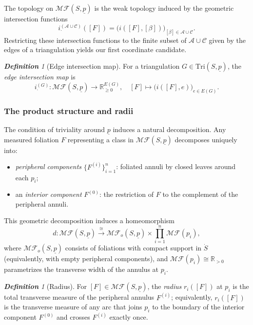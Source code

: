 \documentclass[11pt, letterpaper]{amsart}
\theoremstyle{definition}
\theoremstyle{remark}
\newtheorem{definition}[theorem]{\rm\bf Definition}
\newcommand{\up}{\underline{p}}
\newcommand{\Sp}{(S,\up)}
\newcommand{\TSp}{\text{Tri}\Sp}
\newcommand{\iG}{i^{(G)}}
\newcommand{\cMF}{\mathcal{MF}}
\newcommand{\cMFp}{\mathcal{MF} (S,\up)}
\newcommand{\cMFo}{\cMF_o(S,\up)}
\newcommand{\cAC}{\mathcal{A} \cup \mathcal{C}}
\newcommand{\bR}{\mathbb{R}}
\newcommand{\DEF}{} \newcommand{\WARN}{\textcolor{red}} \newcommand{\ALT}{\textcolor{brown}} \newcommand{\TODO}{\textcolor{teal}} %
\numberwithin{equation}{section}
\begin{document}
The topology on \(\cMFp\) is the weak topology induced by the geometric intersection functions
\[
i^{(\cAC)}_{\cdot}([F]) = \big(i([F],[\beta])\big)_{[\beta]\in\cAC}.
\]
Restricting these intersection functions to the finite subset of \(\cAC\) given by the edges of a triangulation yields our first coordinate candidate.

\begin{definition}[Edge intersection map]
\label{def:MF.edge.inter.}
For a triangulation \(G\in\TSp\), the \DEF{\em edge intersection map} is
\[
\iG_{\cdot}: \cMFp \longrightarrow \bR_{\ge0}^{E(G)}, \quad [F] \longmapsto \big(i([F],e)\big)_{e\in E(G)}.
\]
\end{definition}







     \subsubsection{The product structure and radii} \label{subsec:prod.str.MF.}

The condition of triviality around \(\up\) induces a natural decomposition.
Any measured foliation \(F\) representing a class in \(\cMFp\) decomposes uniquely into:
\begin{itemize}
    \item \emph{peripheral components} \(\{F^{(i)}\}_{i=1}^n\): foliated annuli by closed leaves around each \(p_i\);
    \item an \emph{interior component} \(F^{(0)}\): the restriction of \(F\) to the complement of the peripheral annuli.
\end{itemize}
This geometric decomposition induces a homeomorphism \cite[Prop.~2.2]{PP93}
\begin{equation}
\label{map:prod.str.MF}
    d: \cMFp \xrightarrow{\cong} \cMFo \times \prod_{i=1}^n \cMF(p_i),
\end{equation}
where \(\cMFo\) consists of foliations with compact support in \(\dot{S}\) (equivalently, with empty peripheral components), and \(\cMF(p_i) \cong \bR_{>0}\) parametrizes the transverse width of the annulus at \(p_i\).

\begin{definition}[Radius]
\label{def:radius.peripheral}
For \([F]\in\cMFp\), the \DEF{\em radius} \(r_i([F])\) at \(p_i\) is the total transverse measure of the peripheral annulus \(F^{(i)}\); equivalently, \(r_i([F])\) is the transverse measure of any arc that joins \(p_i\) to the boundary of the interior component \(F^{(0)}\) and crosses \(F^{(i)}\) exactly once.
\end{definition}
\end{document}
